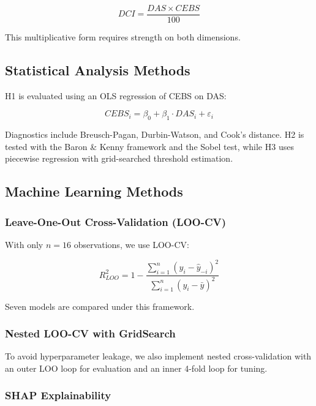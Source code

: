 \documentclass[conference]{IEEEtran}
\begin{document}
\begin{equation}
    DCI = \frac{DAS \times CEBS}{100}
\end{equation}

This multiplicative form requires strength on both dimensions.

\subsection{Statistical Analysis Methods}

H1 is evaluated using an OLS regression of CEBS on DAS:

\begin{equation}
    CEBS_i = \beta_0 + \beta_1 \cdot DAS_i + \varepsilon_i
\end{equation}

\noindent Diagnostics include Breusch-Pagan, Durbin-Watson, and Cook's distance. H2 is tested with the Baron \& Kenny \cite{baron1986} framework and the Sobel test, while H3 uses piecewise regression with grid-searched threshold estimation.

\subsection{Machine Learning Methods}

\subsubsection{Leave-One-Out Cross-Validation (LOO-CV)}

With only $n = 16$ observations, we use LOO-CV:

\begin{equation}
    R^2_{LOO} = 1 - \frac{\sum_{i=1}^{n} (y_i - \hat{y}_{-i})^2}{\sum_{i=1}^{n} (y_i - \bar{y})^2}
\end{equation}

Seven models are compared under this framework.

\subsubsection{Nested LOO-CV with GridSearch}

To avoid hyperparameter leakage, we also implement nested cross-validation with an outer LOO loop for evaluation and an inner 4-fold loop for tuning.

\subsubsection{SHAP Explainability}
\end{document}
